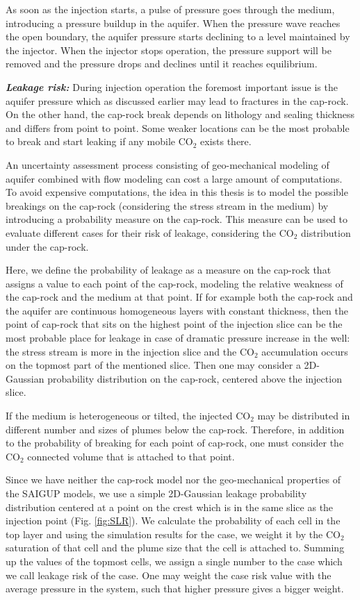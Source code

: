 As soon as the injection starts, a pulse of pressure goes through the
medium, introducing
a pressure buildup in the aquifer. When the pressure wave reaches the open
boundary, the aquifer pressure starts declining to a level maintained by the
injector. When the injector stops operation, the pressure support will be
removed and the pressure drops and declines until it reaches equilibrium.

\textbf{\textit{Leakage risk:}} During injection operation the foremost
important issue is the aquifer pressure
which as discussed earlier may lead to fractures in the cap-rock. On the other
hand, the cap-rock break depends on lithology and sealing thickness and differs
from point to point. Some weaker locations can be the most probable to
break and start leaking if any mobile CO$_2$ exists there.

An uncertainty assessment process consisting of geo-mechanical modeling of aquifer combined with flow modeling can cost a large amount of computations. To avoid expensive computations, the idea in this thesis is to model the possible breakings on the cap-rock (considering the stress stream in the medium) by introducing a probability measure on the cap-rock. This measure can be used to
evaluate different cases for their risk of leakage, considering the CO$_2$
distribution under the cap-rock. 

Here, we define the probability of leakage as a measure on the cap-rock that
assigns a value to each point of the cap-rock, modeling the relative weakness of
the cap-rock and the medium at that point. If for example both the cap-rock and
the aquifer are continuous homogeneous layers with constant thickness, then the
point of cap-rock that sits on the highest point of the injection slice can be
the most probable place for leakage in case of dramatic pressure increase in the
well: the stress stream is more in the injection slice and the CO$_2$
accumulation occurs on the topmost part of the mentioned slice. Then one may
consider a 2D-Gaussian probability distribution on the cap-rock, centered above
the injection slice.

If the medium is heterogeneous or tilted, the injected CO$_2$ may be distributed
in different number and sizes of plumes below the cap-rock. Therefore, in
addition to the probability of breaking for each point of cap-rock, one must
consider the CO$_2$ connected volume that is attached to that point. 

Since we have neither the cap-rock model nor the geo-mechanical properties of
the SAIGUP models, we use a simple 2D-Gaussian leakage probability distribution
centered at a point on the crest which is in the same slice as the injection
point (Fig. \ref{fig:SLR}). We calculate the probability of each cell in the top
layer and using the simulation results for the case, we weight it by the CO$_2$
saturation of that cell and the plume size that the cell is attached to.
Summing up the values of the topmost cells, we assign a single number to the
case which we call leakage risk of the case. One may weight the case risk value
with the average pressure in the system, such that higher pressure gives a
bigger weight.
\vskip 0.5cm

